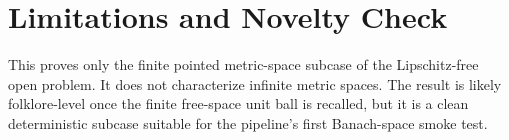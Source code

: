 \documentclass[11pt]{article}
\begin{document}
\section*{Limitations and Novelty Check}

This proves only the finite pointed metric-space subcase of the
Lipschitz-free open problem. It does not characterize infinite metric
spaces. The result is likely folklore-level once the finite free-space
unit ball is recalled, but it is a clean deterministic subcase suitable
for the pipeline's first Banach-space smoke test.
\end{document}
